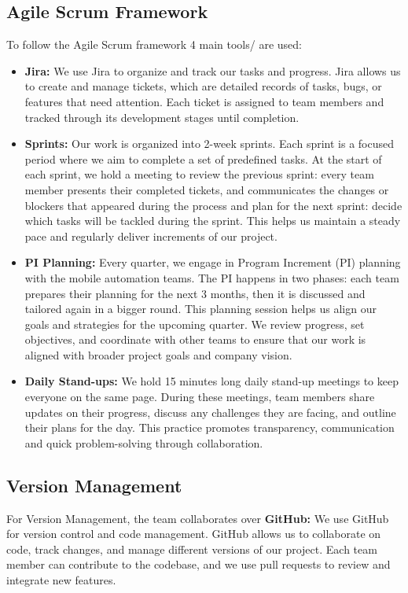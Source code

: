 \subsection{Agile Scrum Framework} 
To follow the Agile Scrum framework 4 main tools/ are used:
\begin{itemize}
    \item \textbf{Jira: } We use Jira to organize and track our tasks and progress. Jira allows us to create 
    and manage tickets, which are detailed records of tasks, bugs, or features that need attention. 
    Each ticket is assigned to team members and tracked through its development stages until completion.

    \item \textbf{Sprints: } Our work is organized into 2-week sprints. Each sprint is a focused period 
    where we aim to complete a set of predefined tasks. At the start of each sprint, we hold a meeting to 
    review the previous sprint: every team member presents their completed tickets, and communicates the 
    changes or blockers that appeared during the process and plan for the next sprint: decide which tasks 
    will be tackled during the sprint. 
    This helps us maintain a steady pace and regularly deliver increments of our project.

    \item  \textbf{PI Planning: } Every quarter, we engage in Program Increment (PI) planning with the 
    mobile automation teams. The PI happens in two phases: each team prepares their planning for the next 3
    months, then it is discussed and tailored again in a bigger round. This planning session helps us align 
    our goals and strategies for the upcoming quarter. We review progress, set objectives, and coordinate 
    with other teams to ensure that our work is aligned with broader project goals and company vision.

    \item \textbf{Daily Stand-ups: } We hold 15 minutes long daily stand-up meetings to keep everyone on the 
    same page. During these meetings, team members share updates on their progress, discuss any challenges 
    they are facing, and outline their plans for the day. This practice promotes transparency, communication and quick 
    problem-solving through collaboration.

\end{itemize}

\subsection{Version Management}
For Version Management, the team collaborates over \textbf{GitHub: }We use GitHub for version control and 
code management. GitHub allows us to 
    collaborate on code, track changes, and manage different versions of our project. Each team member 
    can contribute to the codebase, and we use pull requests to review and integrate new features.


